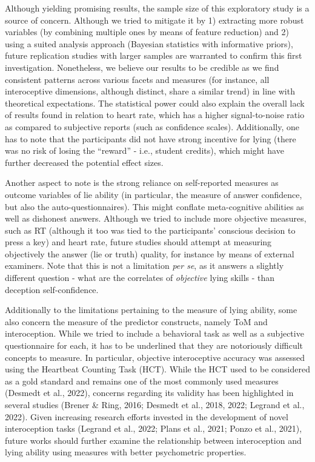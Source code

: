 \documentclass[
  man,mask,floatsintext]{apa6}
\begin{document}
Although yielding promising results, the sample size of this exploratory study is a source of concern. Although we tried to mitigate it by 1) extracting more robust variables (by combining multiple ones by means of feature reduction) and 2) using a suited analysis approach (Bayesian statistics with informative priors), future replication studies with larger samples are warranted to confirm this first investigation. Nonetheless, we believe our results to be credible as we find consistent patterns across various facets and measures (for instance, all interoceptive dimensions, although distinct, share a similar trend) in line with theoretical expectations. The statistical power could also explain the overall lack of results found in relation to heart rate, which has a higher signal-to-noise ratio as compared to subjective reports (such as confidence scales). Additionally, one has to note that the participants did not have strong incentive for lying (there was no risk of losing the ``reward'' - i.e., student credits), which might have further decreased the potential effect sizes.

Another aspect to note is the strong reliance on self-reported measures as outcome variables of lie ability (in particular, the measure of answer confidence, but also the auto-questionnaires). This might conflate meta-cognitive abilities as well as dishonest answers. Although we tried to include more objective measures, such as RT (although it too was tied to the participants' conscious decision to press a key) and heart rate, future studies should attempt at measuring objectively the answer (lie or truth) quality, for instance by means of external examiners. Note that this is not a limitation \emph{per se}, as it answers a slightly different question - what are the correlates of \emph{objective} lying skills - than deception self-confidence.

Additionally to the limitations pertaining to the measure of lying ability, some also concern the measure of the predictor constructs, namely ToM and interoception. While we tried to include a behavioral task as well as a subjective questionnaire for each, it has to be underlined that they are notoriously difficult concepts to measure. In particular, objective interoceptive accuracy was assessed using the Heartbeat Counting Task (HCT). While the HCT used to be considered as a gold standard and remains one of the most commonly used measures (Desmedt et al., 2022), concerns regarding its validity has been highlighted in several studies (Brener \& Ring, 2016; Desmedt et al., 2018, 2022; Legrand et al., 2022). Given increasing research efforts invested in the development of novel interoception tasks (Legrand et al., 2022; Plans et al., 2021; Ponzo et al., 2021), future works should further examine the relationship between interoception and lying ability using measures with better psychometric properties.
\end{document}
